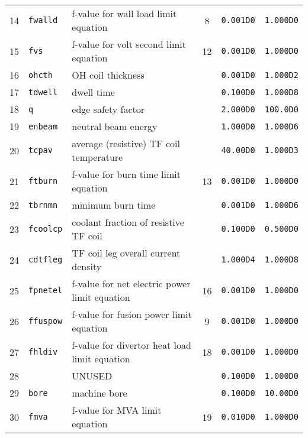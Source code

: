 \documentclass[11pt,a4paper]{report}
\begin{document}
\begin{table}[tbph]
\begin{center}
\begin{tabular}{||c|l|l|c|c|c||}
14  & \texttt{fwalld}   & f-value for wall load limit equation          & 8   & \texttt{0.001D0} & \texttt{1.000D0} \\
15  & \texttt{fvs}      & f-value for volt second limit equation        & 12  & \texttt{0.001D0} & \texttt{1.000D0} \\
16  & \texttt{ohcth}    & OH coil thickness                             &     & \texttt{0.001D0} & \texttt{1.000D2} \\
17  & \texttt{tdwell}   & dwell time                                    &     & \texttt{0.100D0} & \texttt{1.000D8} \\
18  & \texttt{q}        & edge safety factor                            &     & \texttt{2.000D0} & \texttt{100.0D0} \\
19  & \texttt{enbeam}   & neutral beam energy                           &     & \texttt{1.000D0} & \texttt{1.000D6} \\
20  & \texttt{tcpav}    & average (resistive) TF coil temperature       &     & \texttt{40.00D0} & \texttt{1.000D3} \\
21  & \texttt{ftburn}   & f-value for burn time limit equation          & 13  & \texttt{0.001D0} & \texttt{1.000D0} \\
22  & \texttt{tbrnmn}   & minimum burn time                             &     & \texttt{0.001D0} & \texttt{1.000D6} \\
23  & \texttt{fcoolcp}  & coolant fraction of resistive TF coil         &     & \texttt{0.100D0} & \texttt{0.500D0} \\
24  & \texttt{cdtfleg}  & TF coil leg overall current density           &     & \texttt{1.000D4} & \texttt{1.000D8} \\
25  & \texttt{fpnetel}  & f-value for net electric power limit equation & 16  & \texttt{0.001D0} & \texttt{1.000D0} \\
26  & \texttt{ffuspow}  & f-value for fusion power limit equation       & 9   & \texttt{0.001D0} & \texttt{1.000D0} \\
27  & \texttt{fhldiv}   & f-value for divertor heat load limit equation & 18  & \texttt{0.001D0} & \texttt{1.000D0} \\
28  &                   & UNUSED                                        &     & \texttt{0.100D0} & \texttt{1.000D0} \\
29  & \texttt{bore}     & machine bore                                  &     & \texttt{0.100D0} & \texttt{10.00D0} \\
30  & \texttt{fmva}     & f-value for MVA limit equation                & 19  & \texttt{0.010D0} & \texttt{1.000D0} \\

\end{tabular}
\end{center}
\end{table}
\end{document}
